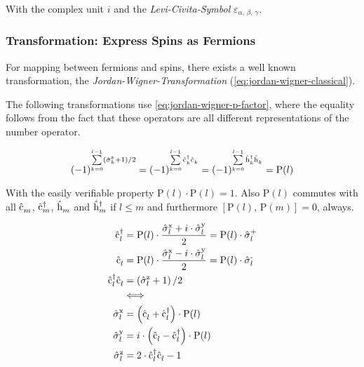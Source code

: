 With the complex unit $i$ and the \emph{Levi-Civita-Symbol} $\varepsilon_{\alpha,\,\beta,\,\gamma}$.

\subsubsection*{Transformation: Express Spins as Fermions}
For mapping between fermions and spins, there exists a well known transformation, the \emph{Jordan-Wigner-Transformation} \cite{jordanWignerBaseCase} (\autoref{eq:jordan-wigner-classical}).

The following transformations use \autoref{eq:jordan-wigner-p-factor}, where the equality follows from the fact that these operators are all different representations of the number operator.

\begin{equation}
    \label{eq:jordan-wigner-p-factor}
\left(-1\right)^{\sum\limits_{k=0}^{l-1} \left( \pauli[k]{z} +1 \right)/2 } = 
\left(-1\right)^{\sum\limits_{k=0}^{l-1}\cop{k}{\dagger}\cop{k}{} } =
\left(-1\right)^{\sum\limits_{k=0}^{l-1}\hop{k}{\dagger}\hop{k}{} } = 
\text{P}(l)
\end{equation}

With the easily verifiable property $\text{P}(l)\cdot \text{P}(l) = 1$. Also $\text{P}(l)$ commutes with all $\hat{\text{c}}^{ }_{m}$, $\hat{\text{c}}^{\dagger }_{m}$, $\hat{\text{h}}^{ }_{m}$ and $\hat{\text{h}}^{\dagger }_{m}$ if $l\leq m$ and furthermore $\left[\text{P}(l),\, \text{P}(m)\right] = 0$, always.

\begin{equation}
    \label{eq:jordan-wigner-classical}
    \begin{split}
        \cop{l}{\dagger} &= \text{P}(l) \cdot \frac{\pauli[l]{x} + i\cdot \pauli[l]{y}}{2} = \text{P}(l) \cdot \pauli[l]{+}\\
        \cop{l}{} &= \text{P}(l) \cdot \frac{\pauli[l]{x} - i\cdot \pauli[l]{y}}{2} = \text{P}(l) \cdot \pauli[l]{-}\\
        \cop{l}{\dagger}\cop{l}{} &= \left( \pauli[l]{z} +1 \right)/2\\
        &\Longleftrightarrow \\
        \pauli[l]{x} &= \left(\cop{l}{} + \cop{l}{\dagger}\right) \cdot \text{P}(l) \\
        \pauli[l]{y} &= i \cdot \left(\cop{l}{} - \cop{l}{\dagger}\right) \cdot \text{P}(l)\\
        \pauli[l]{z} &= 2 \cdot \cop{l}{\dagger}\cop{l}{} -1
    \end{split}
\end{equation}

